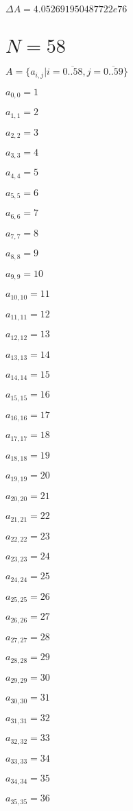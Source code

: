 \documentclass[a4paper,12pt]{article}
\begin{document}
$\Delta A = 4.052691950487722e76$



\section{ $N = 58$ }
$A = \{ a _{ i, j } | i = \overline { 0..58 }, j = \overline { 0..59 } \}$

$a _{ 0, 0 } = 1$

$a _{ 1, 1 } = 2$

$a _{ 2, 2 } = 3$

$a _{ 3, 3 } = 4$

$a _{ 4, 4 } = 5$

$a _{ 5, 5 } = 6$

$a _{ 6, 6 } = 7$

$a _{ 7, 7 } = 8$

$a _{ 8, 8 } = 9$

$a _{ 9, 9 } = 10$

$a _{ 10, 10 } = 11$

$a _{ 11, 11 } = 12$

$a _{ 12, 12 } = 13$

$a _{ 13, 13 } = 14$

$a _{ 14, 14 } = 15$

$a _{ 15, 15 } = 16$

$a _{ 16, 16 } = 17$

$a _{ 17, 17 } = 18$

$a _{ 18, 18 } = 19$

$a _{ 19, 19 } = 20$

$a _{ 20, 20 } = 21$

$a _{ 21, 21 } = 22$

$a _{ 22, 22 } = 23$

$a _{ 23, 23 } = 24$

$a _{ 24, 24 } = 25$

$a _{ 25, 25 } = 26$

$a _{ 26, 26 } = 27$

$a _{ 27, 27 } = 28$

$a _{ 28, 28 } = 29$

$a _{ 29, 29 } = 30$

$a _{ 30, 30 } = 31$

$a _{ 31, 31 } = 32$

$a _{ 32, 32 } = 33$

$a _{ 33, 33 } = 34$

$a _{ 34, 34 } = 35$

$a _{ 35, 35 } = 36$
\end{document}
